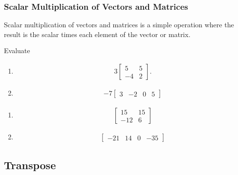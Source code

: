 \subsubsection{Scalar Multiplication of Vectors and Matrices}

Scalar multiplication of vectors and matrices is a simple operation where the result is the scalar times each element of the vector or matrix.  

\begin{example}
	Evaluate
	
	
\begin{enumerate}[label=(\alph*)]
\item 
\begin{align*} 3
\begin{bmatrix}
	5 & 5 \\
-4 & 2
\end{bmatrix}.
\end{align*} 

\item \begin{align*}
-7 \begin{bmatrix}
 3 & -2 & 0 & 5 
\end{bmatrix}
\end{align*}
\end{enumerate}

\solution

\begin{enumerate}[label=(\alph*)]
\item 
\begin{align*}
\begin{bmatrix}
	15 & 15 \\ -12 & 6
\end{bmatrix}
\end{align*}

\item 
\begin{align*}
\begin{bmatrix}
 -21 & 14 & 0 & -35 
\end{bmatrix}
\end{align*}
\end{enumerate}
\end{example}

\subsection{Transpose} \label{sect:transpose}

